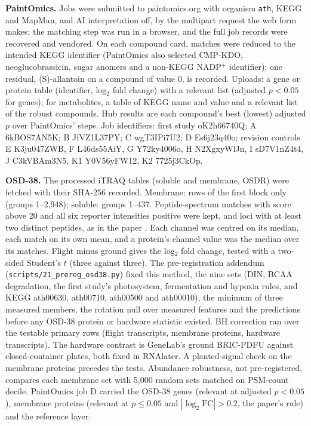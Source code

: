 \documentclass{npjlayout}
\begin{document}
\textbf{PaintOmics.} Jobs were submitted to paintomics.org with organism \texttt{ath}, KEGG and
MapMan, and AI interpretation off, by the multipart request the web form makes; the matching step
was run in a browser, and the full job records were recovered and vendored. On each compound card,
matches were reduced to the intended KEGG identifier (PaintOmics also selected CMP-KDO,
neoglucobrassicin, sugar anomers and a non-KEGG NADP$^+$ identifier); one residual, (S)-allantoin on
a compound of value 0, is recorded. Uploads: a gene or protein table (identifier, log$_2$ fold
change) with a relevant list (adjusted $p<0.05$ for genes); for metabolites, a table of KEGG name and
value and a relevant list of the robust compounds. Hub results are each compound's best (lowest)
adjusted $p$ over PaintOmics' steps. Job identifiers: first study oK2h66740Q; A 6kBOS7AN5K; B
JfVZ1L37PY; C wgT3IPi7U2; D Es6j23q40o; revision controls E K3ju047ZWB, F L46ds55AiY, G
Y72ky4006o, H N2XgxyWlJn, I sD7V1nZ4t4, J C3kVBAm3N5, K1 Y0V56yFW12, K2 7725j3CkOp.

\textbf{OSD-38.} The processed iTRAQ tables (soluble and membrane, OSDR) were fetched with their
SHA-256 recorded. Membrane: rows of the first block only (groups 1--2{,}948); soluble: groups
1--437. Peptide-spectrum matches with score above 20 and all six reporter intensities positive were
kept, and loci with at least two distinct peptides, as in the paper \citep{kruse2020}. Each
channel was centred on its median, each match on its own mean, and a protein's channel value was
the median over its matches. Flight minus ground gives the log$_2$ fold change, tested with a
two-sided Student's $t$ (three against three). The pre-registration addendum
(\texttt{scripts/21\_prereg\_osd38.py}) fixed this method, the nine sets (DIN, BCAA degradation,
the first study's photosystem, fermentation and hypoxia rules, and KEGG ath00630, ath00710,
ath00500 and ath00010), the minimum of three measured members, the rotation null over measured
features and the predictions before any OSD-38 protein or hardware statistic existed. BH
correction ran over the testable primary rows (flight transcripts, membrane proteins, hardware
transcripts). The hardware contrast is GeneLab's ground BRIC-PDFU against closed-container plates,
both fixed in RNAlater. A planted-signal check on the membrane proteins precedes the tests.
Abundance robustness, not pre-registered, compares each membrane set with 5{,}000 random sets
matched on PSM-count decile. PaintOmics job D carried the OSD-38 genes (relevant at adjusted
$p<0.05$), membrane proteins (relevant at $p\le0.05$ and $|\log_2\mathrm{FC}|>0.2$, the paper's
rule) and the reference layer.
\end{document}
